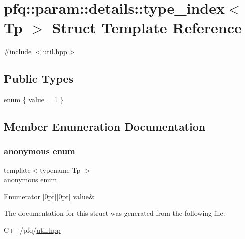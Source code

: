\hypertarget{structpfq_1_1param_1_1details_1_1type__index_3_01Tp_01_4}{}\section{pfq\+:\+:param\+:\+:details\+:\+:type\+\_\+index$<$ Tp $>$ Struct Template Reference}
\label{structpfq_1_1param_1_1details_1_1type__index_3_01Tp_01_4}


{\ttfamily \#include $<$util.\+hpp$>$}

\subsection*{Public Types}
\begin{DoxyCompactItemize}
\item 
enum \{ \hyperlink{structpfq_1_1param_1_1details_1_1type__index_3_01Tp_01_4_af9d771ebd1b38996ae3631c8330e6bdda74fe01056516d2934b6ce777009cffe4}{value} = 1
 \}
\end{DoxyCompactItemize}


\subsection{Member Enumeration Documentation}
\mbox{\label{structpfq_1_1param_1_1details_1_1type__index_3_01Tp_01_4_af9d771ebd1b38996ae3631c8330e6bdd}} 
\subsubsection{\texorpdfstring{anonymous enum}{anonymous enum}}
{\footnotesize\ttfamily template$<$typename Tp $>$ \\
anonymous enum}

\begin{DoxyEnumFields}{Enumerator}
[0pt][0pt]{}\mbox{\label{structpfq_1_1param_1_1details_1_1type__index_3_01Tp_01_4_af9d771ebd1b38996ae3631c8330e6bdda74fe01056516d2934b6ce777009cffe4}} 
value&\\
\hline

\end{DoxyEnumFields}


The documentation for this struct was generated from the following file\+:\begin{DoxyCompactItemize}
\item 
C++/pfq/\hyperlink{util_8hpp}{util.\+hpp}\end{DoxyCompactItemize}
